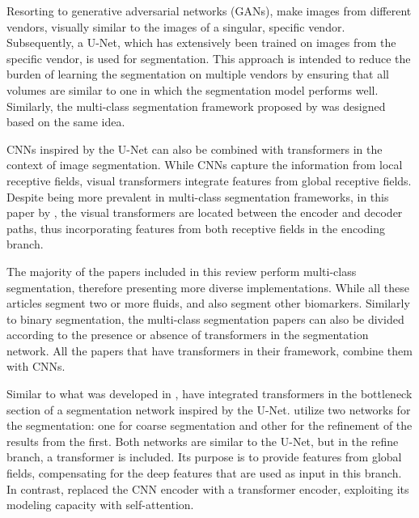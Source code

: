\par
Resorting to generative adversarial networks (GANs), \textcite{Wu2023} make images from different vendors, visually similar to the images of a singular, specific vendor. Subsequently, a U-Net, which has extensively been trained on images from the specific vendor, is used for segmentation. This approach is intended to reduce the burden of learning the segmentation on multiple vendors by ensuring that all volumes are similar to one in which the segmentation model performs well. Similarly, the multi-class segmentation framework proposed by \textcite{Li2023} was designed based on the same idea. 
\par
CNNs inspired by the U-Net can also be combined with transformers in the context of image segmentation. While CNNs capture the information from local receptive fields, visual transformers integrate features from global receptive fields. Despite being more prevalent in multi-class segmentation frameworks, in this paper by \textcite{Quek2022}, the visual transformers are located between the encoder and decoder paths, thus incorporating features from both receptive fields in the encoding branch.
\par
The majority of the papers included in this review perform multi-class segmentation, therefore presenting more diverse implementations. While all these articles segment two or more fluids, \textcite{Hassan2021a} and \textcite{Padilla2022} also segment other biomarkers. Similarly to binary segmentation, the multi-class segmentation papers can also be divided according to the presence \parencite{Zhang2023, Liu2024} or absence \parencite{Rahil2023, Hassan2021a, Sappa2021, Xing2022, Tang2022, Padilla2022, Hu2019, Mantel2021, Li2023, Gao2019, Hassan2021b, Lu2019} of transformers in the segmentation network. All the papers that have transformers in their framework, combine them with CNNs. 
\par
Similar to what was developed in \textcite{Quek2022}, \textcite{Liu2024} have integrated transformers in the bottleneck section of a segmentation network inspired by the U-Net. \textcite{Liu2024} utilize two networks for the segmentation: one for coarse segmentation and other for the refinement of the results from the first. Both networks are similar to the U-Net, but in the refine branch, a transformer is included. Its purpose is to provide features from global fields, compensating for the deep features that are used as input in this branch. In contrast, \textcite{Zhang2023} replaced the CNN encoder with a transformer encoder, exploiting its modeling capacity with self-attention.
